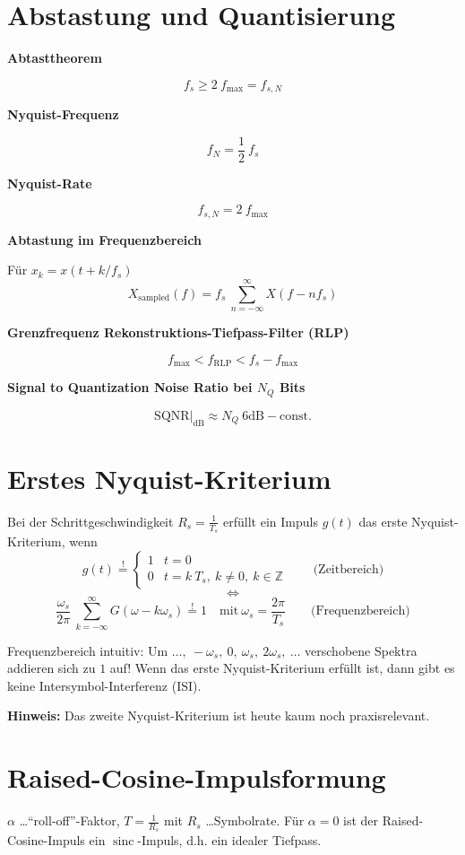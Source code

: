 \documentclass[a4paper, 11pt]{article}
\newcommand{\fancyformula}[2]{
        \small
        \raggedright{\sffamily\textbf{#1}}
        #2
}
\DeclareMathOperator{\sinc}{sinc}
\begin{document}
\section*{Abstastung und Quantisierung}
\begin{multicols}{2}
	\fancyformula{Abtasttheorem}{
		\[
			f_s \geq 2 ~ f_{\mathrm{max}} = f_{s, N}
		\]
	}

	\fancyformula{Nyquist-Frequenz}{
		\[
			f_N = \frac{1}{2} ~ f_s
		\]
	}

	\fancyformula{Nyquist-Rate}{
		\[
			f_{s, N} = 2 ~ f_{\mathrm{max}}
		\]
	}

	\fancyformula{Abtastung im Frequenzbereich}{
		Für $x_k = x(t + k / f_s)$
		\[
			X_\mathrm{sampled}(f) = f_s ~ \sum_{n = -\infty}^\infty X(f - n f_s)
		\]
	}

	\fancyformula{Grenzfrequenz Rekonstruktions-Tiefpass-Filter (RLP)}{
		\[
			f_\mathrm{max} < f_\mathrm{RLP} < f_s - f_\mathrm{max}
		\]
	}

	\fancyformula{Signal to Quantization Noise Ratio bei $N_Q$ Bits}{
		\[
			\mathrm{SQNR}|_\mathrm{dB} \approx N_Q ~ 6\mathrm{dB} - \mathrm{const.}
		\]
	}
\end{multicols}

\section*{Erstes Nyquist-Kriterium}
Bei der Schrittgeschwindigkeit $R_s = \frac{1}{T_s}$ erfüllt ein Impuls $g(t)$ das erste Nyquist-Kriterium, wenn
\[
	g(t) \overset{!}{=} \begin{cases}
		1 & t = 0\\
		0 & t = k ~ T_s, ~ k \neq 0, ~ k \in \mathbb Z
	\end{cases} \qquad \text{(Zeitbereich)}
\]
\[
	\Leftrightarrow
\]
\[
	\frac{\omega_s}{2 \pi} ~ \sum_{k = -\infty}^\infty G(\omega - k \omega_s) \overset{!}{=} 1 \quad \text{mit} ~ \omega_s = \frac{2 \pi}{T_s} \qquad \text{(Frequenzbereich)}
\]

Frequenzbereich intuitiv: Um $\ldots, ~ -\omega_s, ~ 0, ~ \omega_s, ~ 2 \omega_s, ~ \ldots$ verschobene Spektra addieren sich zu $1$ auf!
Wenn das erste Nyquist-Kriterium erfüllt ist, dann gibt es keine Intersymbol-Interferenz (ISI).

\textbf{Hinweis:} Das zweite Nyquist-Kriterium ist heute kaum noch praxisrelevant.

\section*{Raised-Cosine-Impulsformung}
$\alpha$ \ldots ``roll-off''-Faktor, $T = \frac{1}{R_s}$ mit $R_s$ \ldots Symbolrate. Für $\alpha = 0$ ist der Raised-Cosine-Impuls ein $\sinc$-Impuls, d.h. ein idealer Tiefpass.
\end{document}

